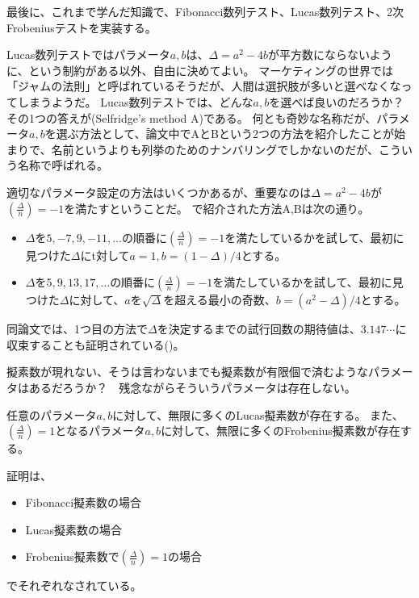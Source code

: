 最後に、これまで学んだ知識で、Fibonacci数列テスト、Lucas数列テスト、2次Frobeniusテストを実装する。


Lucas数列テストではパラメータ$a,b$は、$\Delta=a^2-4b$が平方数にならないように、という制約がある以外、自由に決めてよい。
マーケティングの世界では「ジャムの法則」と呼ばれているそうだが、人間は選択肢が多いと選べなくなってしまうようだ。
Lucas数列テストでは、どんな$a,b$を選べば良いのだろうか？　その1つの答えが(Selfridge's method A)\cite{selfridge_method}である。
何とも奇妙な名称だが、パラメータ$a,b$を選ぶ方法として、論文中でAとBという2つの方法を紹介したことが始まりで、名前というよりも列挙のためのナンバリングでしかないのだが、こういう名称で呼ばれる。

適切なパラメータ設定の方法はいくつかあるが、重要なのは$\Delta=a^2-4b$が$\left(\frac{\Delta}{n}\right)=-1$を満たすということだ。
\cite{selfridge_method}で紹介された方法A,Bは次の通り。
\begin{itemize}
 \item $\Delta$を$5,-7,9,-11,\ldots$の順番に$\left(\frac{\Delta}{n}\right)=-1$を満たしているかを試して、最初に見つけた$\Delta$にt対して$a=1,b=(1-\Delta)/4$とする。
 \item $\Delta$を$5,9,13,17,\ldots$の順番に$\left(\frac{\Delta}{n}\right)=-1$を満たしているかを試して、最初に見つけた$\Delta$に対して、$a$を$\sqrt{\Delta}$を超える最小の奇数、$b=(a^2-\Delta)/4$とする。
\end{itemize}
同論文では、1つ目の方法で$\Delta$を決定するまでの試行回数の期待値は、$3.147\cdots$に収束することも証明されている(\cite[定理9]{selfridge_method})。


擬素数が現れない、そうは言わないまでも擬素数が有限個で済むようなパラメータはあるだろうか？　残念ながらそういうパラメータは存在しない。

\begin{Theo}{}{}
任意のパラメータ$a,b$に対して、無限に多くのLucas擬素数が存在する。
また、$\left(\frac{\Delta}{n}\right)=1$となるパラメータ$a,b$に対して、無限に多くのFrobenius擬素数が存在する。
\end{Theo}

証明は、
\begin{itemize}
 \item Fibonacci擬素数の場合\cite{fibonacci_pseudoprimes_infinite}
 \item Lucas擬素数の場合\cite{lucas_pseudoprimes_infinite}
 \item Frobenius擬素数で$\left(\frac{\Delta}{n}\right)=1$の場合\cite{frobenius_pseudoprimes_infinite}
\end{itemize}
でそれぞれなされている。

